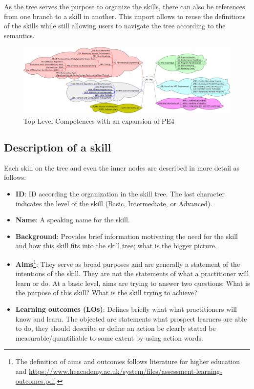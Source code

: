 \documentclass[jocse]{jocseart}
\begin{document}
As the tree serves the purpose to organize the skills, there can also be references from one branch to a skill in another.
This import allows to reuse the definitions of the skills while still allowing users to navigate the tree according to the semantics.

\begin{figure}[tb!]
	\centering
	\includegraphics[width=15.0cm]{skill-tree}
	\caption{Top Level Competences with an expansion of PE4}
	\label{f_top_level_competences}
\end{figure}

\subsection{Description of a skill}

Each skill on the tree and even the inner nodes are described in more detail as follows:

\begin{itemize}
  \item \textbf{ID}: ID according the organization in the skill tree. The last character indicates the level of the skill (Basic, Intermediate, or Advanced).
  \item \textbf{Name}: A speaking name for the skill.
  \item \textbf{Background}: Provides brief information motivating the need for the skill and how this skill fits into the skill tree; what is the bigger picture.
  \item \textbf{Aims}\footnote{The definition of aims and outcomes follows literature for higher education \cite{williamson2011good} and \url{https://www.heacademy.ac.uk/system/files/assessment-learning-outcomes.pdf}.}: They serve as broad purposes and are generally a statement of the intentions of the skill.
  They are not the statements of what a practitioner will learn or do.
  At a basic level, aims are trying to answer two questions: What is the purpose of this skill?
  What is the skill trying to achieve?
  \item \textbf{Learning outcomes (LOs)}: Defines briefly what what practitioners will know and learn.
  The objected are statements what prospect learners are able to do, they should
  describe or define an action be clearly stated be measurable/quantifiable to some extent by using action words.
\end{itemize}
\end{document}
